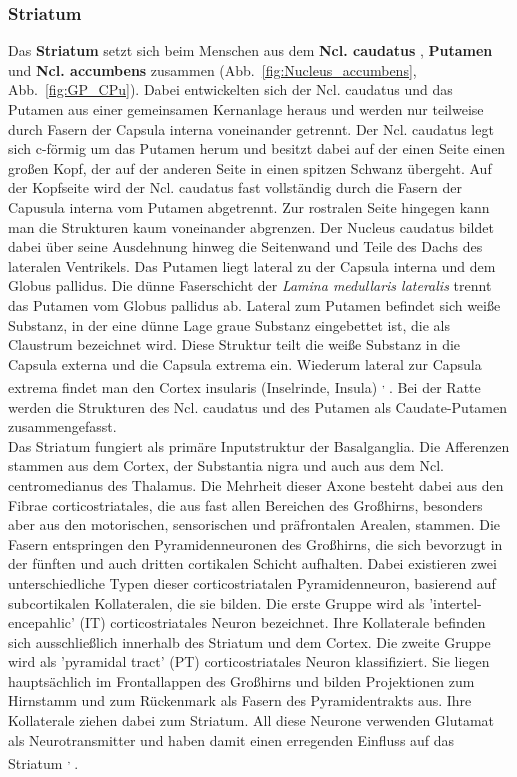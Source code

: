 \subsubsection*{Striatum} 
Das \textbf{Striatum} setzt sich beim Menschen aus dem \textbf{Ncl. caudatus} , \textbf{Putamen}  und \textbf{Ncl. accumbens}  zusammen (Abb.~\ref{fig:Nucleus_accumbens}, Abb.~\ref{fig:GP_CPu}). Dabei entwickelten sich der Ncl. caudatus und das Putamen aus einer gemeinsamen Kernanlage heraus und werden nur teilweise durch Fasern der Capsula interna voneinander getrennt. Der Ncl. caudatus legt sich c-förmig um das Putamen herum und besitzt dabei auf der einen Seite einen großen Kopf, der auf der anderen Seite in einen spitzen Schwanz übergeht. Auf der Kopfseite wird der Ncl. caudatus fast vollständig durch die Fasern der Capusula interna vom Putamen abgetrennt. Zur rostralen Seite hingegen kann man die Strukturen kaum voneinander abgrenzen. Der Nucleus caudatus bildet dabei über seine Ausdehnung hinweg die Seitenwand und Teile des Dachs des lateralen Ventrikels. Das Putamen liegt lateral zu der Capsula interna und dem Globus pallidus. Die dünne Faserschicht der \textit{Lamina medullaris lateralis} trennt das Putamen vom Globus pallidus ab. Lateral zum Putamen befindet sich weiße Substanz, in der eine dünne Lage graue Substanz eingebettet ist, die als Claustrum bezeichnet wird. Diese Struktur teilt die weiße Substanz in die Capsula externa und die Capsula extrema ein. Wiederum lateral zur Capsula extrema findet man den Cortex insularis (Inselrinde, Insula)  \textsuperscript{\cite[Kap.~14]{crossman2014neuroanatomy}, \cite[9]{trepel2011neuroanatomie}}. Bei der Ratte werden die Strukturen des Ncl. caudatus und des Putamen als Caudate-Putamen zusammengefasst.\\    
Das Striatum fungiert als primäre Inputstruktur der Basalganglia. Die Afferenzen stammen aus dem Cortex, der Substantia nigra und auch aus dem Ncl. centromedianus des Thalamus. Die Mehrheit dieser Axone besteht dabei aus den Fibrae corticostriatales, die aus fast allen Bereichen des Großhirns, besonders aber aus den motorischen, sensorischen und präfrontalen Arealen, stammen. Die Fasern entspringen den Pyramidenneuronen des Großhirns, die sich bevorzugt in der fünften und auch dritten  cortikalen Schicht aufhalten. Dabei existieren zwei unterschiedliche Typen dieser corticostriatalen Pyramidenneuron, basierend auf subcortikalen Kollateralen, die sie bilden. Die erste Gruppe wird als 'intertel-encepahlic' (IT) corticostriatales Neuron bezeichnet. Ihre Kollaterale befinden sich ausschließlich innerhalb des Striatum und dem Cortex. Die zweite Gruppe wird als 'pyramidal tract' (PT) corticostriatales Neuron klassifiziert. Sie liegen hauptsächlich im Frontallappen des Großhirns und bilden Projektionen zum Hirnstamm und zum Rückenmark als Fasern des Pyramidentrakts aus. Ihre Kollaterale ziehen dabei zum Striatum. All diese Neurone verwenden Glutamat als Neurotransmitter und haben damit einen erregenden Einfluss auf das Striatum \textsuperscript{\cite[Kap.~9]{trepel2011neuroanatomie}, \cite[17]{paxinos2014rat}}.\\
